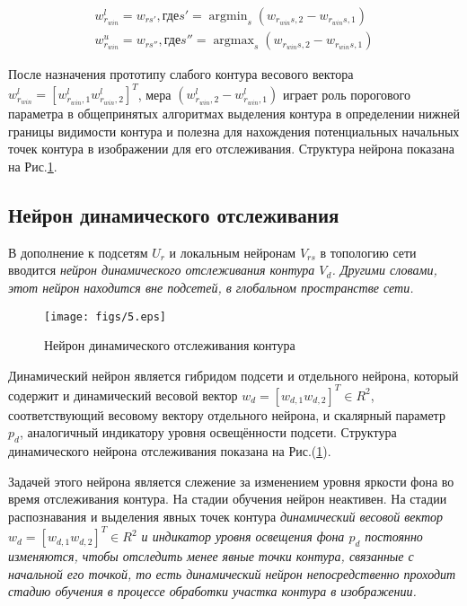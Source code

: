 \documentclass[a4paper,12pt]{report}
\begin{document}
\begin{eqnarray}
w_{r_{win}}^l=w_{rs'}, \mbox{где} s'=\operatorname{argmin}_s(w_{r_{win} s,2}-w_{r_{win} s,1})\nonumber \\
w_{r_{win}}^u=w_{rs''}, \mbox{где} s''=\operatorname{argmax}_s(w_{r_{win} s,2}-w_{r_{win} s,1})\nonumber 
\end{eqnarray}

После назначения прототипу слабого контура весового вектора $w_{r_{win}}^l=[w_{r_{win},1}^l w_{r_{win},2}^l]^T$, мера $(w_{r_{win},2}^l-w_{r_{win},1}^l)$ играет роль порогового параметра в общепринятых алгоритмах выделения контура в определении нижней границы видимости контура и полезна для нахождения потенциальных начальных точек контура в изображении для его отслеживания. Структура нейрона показана на Рис.\ref{neuron1}.

\subsection{Нейрон динамического отслеживания}

В дополнение к подсетям $U_r$ и локальным нейронам $V_{rs}$ в топологию сети вводится \itshape нейрон динамического отслеживания контура \normalfont $V_d$. Другими словами, этот нейрон находится вне подсетей, в глобальном пространстве сети.

\begin{center}
\begin{figure}[!t]
\begin{center}
\texttt{[image: figs/5.eps]}
\end{center}\caption{Нейрон динамического отслеживания контура}
\label{neuron1}
\end{figure}
\end{center}
 
Динамический нейрон является гибридом подсети и отдельного нейрона, который содержит и динамический весовой вектор $w_d=[w_{d,1} w_{d,2}]^T\in R^2$, соответствующий весовому вектору отдельного нейрона, и скалярный параметр $p_d$, аналогичный индикатору уровня освещённости подсети. Структура динамического нейрона отслеживания показана на Рис.(\ref{neuron1}).

Задачей этого нейрона является слежение за изменением уровня яркости фона во время отслеживания контура. На стадии обучения нейрон неактивен. На стадии распознавания и выделения явных точек контура \itshape динамический весовой вектор \normalfont $w_d=[w_{d,1} w_{d,2}]^T\in R^2$ и индикатор уровня освещения фона $p_d$ постоянно изменяются, чтобы отследить менее явные точки контура, связанные с начальной его точкой, то есть динамический нейрон непосредственно проходит стадию обучения в процессе обработки участка контура в изображении.
\end{document}
